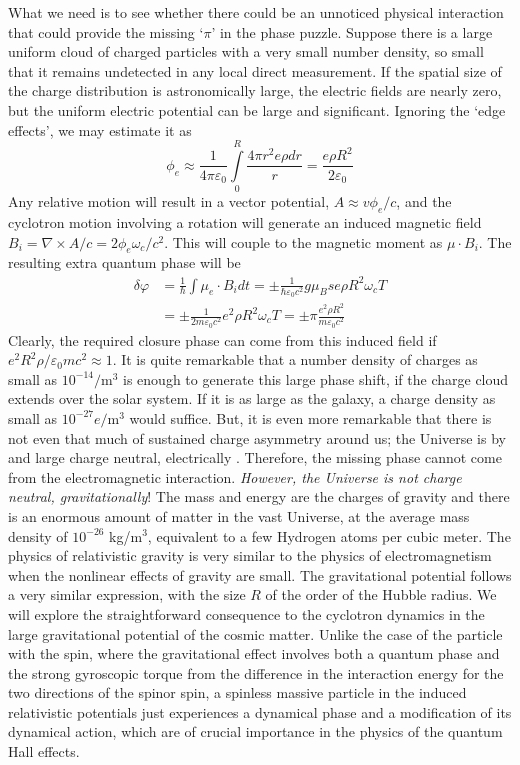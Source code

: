 \documentclass[aps,preprint,12pt,tightenlines]{revtex4}%
\begin{document}
What we need is to see whether there could be an unnoticed physical interaction that
could provide the missing `$\pi$' in the phase puzzle. Suppose there is a
large uniform cloud of charged particles with a very small number density, so
small that it remains undetected in any local direct measurement. If the spatial size
of the charge distribution is astronomically large, the electric fields are nearly zero, but the uniform
electric potential can be large and significant. Ignoring the `edge effects', we may
estimate it as
\begin{equation}
\phi_{e}\approx\frac{1}{4\pi\varepsilon_{0}}\int\limits_{0}^{R}\frac{4\pi
r^{2}e\rho dr}{r}=\frac{e\rho R^{2}}{2\varepsilon_{0}}%
\end{equation}
Any relative motion will result in a vector potential, $A\approx v\phi_{e}/c$,
and the cyclotron motion involving a rotation will generate an induced
magnetic field $B_{i}=\nabla\times A/c=2\phi_{e}\omega_{c}/c^{2}$. This will
couple to the magnetic moment as $\mu\cdot B_i$. The resulting extra quantum phase will be
\begin{align}
\delta\varphi &  =\frac{1}{\hbar}\int\mu_{e}\cdot B_{i}dt=\pm\frac{1}%
{\hbar\varepsilon_{0}c^{2}}g\mu_{B}se\rho R^{2}\omega_{c}T\\
&  =\pm\frac{1}{2m\varepsilon_{0}c^{2}}e^{2}\rho R^{2}\omega_{c}T=\pm\pi
\frac{e^{2}\rho R^{2}}{m\varepsilon_{0}c^{2}}%
\end{align}
Clearly, the required closure phase can come from this induced field if
$e^{2}R^{2}\rho/\varepsilon_{0}mc^{2}\approx1$. It is quite remarkable that a
number density of charges as small as $10^{-14}/$m$^{3}$ is enough to generate
this large phase shift, if the charge cloud extends over the solar system. If
it is as large as the galaxy, a charge density as small as $10^{-27}e/$m$^{3}$
would suffice. But, it is
even more remarkable that there is not even that much of sustained charge
asymmetry around us; the Universe is by and large charge neutral, electrically
\cite{UG-charge}. Therefore, the missing phase cannot come from the
electromagnetic interaction.  \emph{However, the Universe is not charge
neutral, gravitationally}! The mass and energy are the charges of gravity and
there is an enormous amount of matter in the vast Universe, at the average
mass density of $10^{-26}$ kg/m$^{3}$, equivalent to a few Hydrogen atoms per cubic meter. The physics of relativistic gravity is very similar to the physics of electromagnetism when the nonlinear effects
of gravity are small. The gravitational potential follows a very similar
expression, with the size $R$ of the order of the Hubble radius. We will
explore the straightforward consequence to the cyclotron dynamics in the large
gravitational potential of the cosmic matter. Unlike the case of the particle
with the spin, where the gravitational effect involves both a quantum phase
and the strong gyroscopic torque from the difference in the interaction energy
for the two directions of the spinor spin, a spinless massive particle in the
induced relativistic potentials just experiences a dynamical phase and a
modification of its dynamical action, which are of crucial importance in the
physics of the quantum Hall effects.
\end{document}
